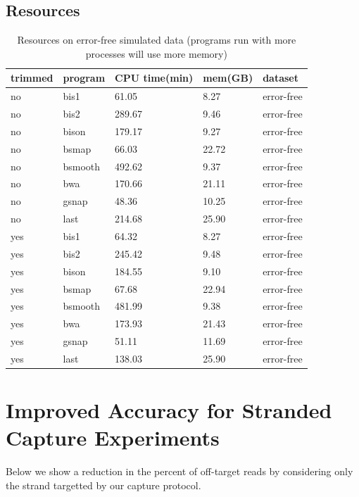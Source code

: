\documentclass[12pt]{article}
\begin{document}
\subsection{Resources}

\begin{table}[H]
    \centering
    \caption{Resources on error-free simulated data
(programs run with more processes will use more memory)}
    \begin{tabular}{lllll} \hline
    trimmed & program & CPU time(min) & mem(GB) & dataset \\ \hline

no &    bis1 & 61.05 & 8.27 & error-free \\
no &    bis2 & 289.67 & 9.46 & error-free \\
no &    bison & 179.17 & 9.27 & error-free \\
no &    bsmap & 66.03 & 22.72 & error-free \\
no &    bsmooth & 492.62 & 9.37 & error-free \\
no &    bwa & 170.66 & 21.11 & error-free \\
no &    gsnap & 48.36 & 10.25 & error-free \\
no &    last & 214.68 & 25.90 & error-free \\

yes &    bis1 & 64.32 & 8.27 & error-free \\
yes &    bis2 & 245.42 & 9.48 & error-free \\
yes &    bison & 184.55 & 9.10 & error-free \\
yes &    bsmap & 67.68 & 22.94 & error-free \\
yes &    bsmooth & 481.99 & 9.38 & error-free \\
yes &    bwa & 173.93 & 21.43 & error-free \\
yes &    gsnap & 51.11 & 11.69 & error-free \\
yes &    last & 138.03 & 25.90 & error-free \\

    \end{tabular}
\end{table}



\section{Improved Accuracy for Stranded Capture Experiments}

Below we show a reduction in the percent of off-target reads by
considering only the strand targetted by our capture protocol.
\end{document}
